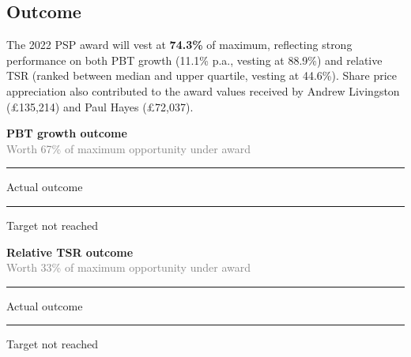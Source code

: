 \documentclass{article}
\begin{document}
\subsection*{Outcome}
The 2022 PSP award will vest at \textbf{74.3\%} of maximum, reflecting strong performance on both PBT growth (11.1\% p.a., vesting at 88.9\%) and relative TSR (ranked between median and upper quartile, vesting at 44.6\%). Share price appreciation also contributed to the award values received by Andrew Livingston (\pounds135,214) and Paul Hayes (\pounds72,037).

\vspace{2em}

\noindent
\begin{minipage}{0.48\textwidth}
\centering
\textbf{\textcolor{pspblue}{PBT growth outcome}}\\
\textcolor{graytext}{\small Worth 67\% of maximum opportunity under award}


\textcolor{pspblue}{\rule{10pt}{10pt}} Actual outcome \hspace{1em}
\textcolor{chartgreen}{\rule{10pt}{10pt}} Target not reached
\end{minipage}
\hfill
\begin{minipage}{0.48\textwidth}
\centering
\textbf{\textcolor{tsrgreen}{Relative TSR outcome}}\\
\textcolor{graytext}{\small Worth 33\% of maximum opportunity under award}


\textcolor{pspblue}{\rule{10pt}{10pt}} Actual outcome \hspace{1em}
\textcolor{chartgreen}{\rule{10pt}{10pt}} Target not reached
\end{minipage}
\end{document}
